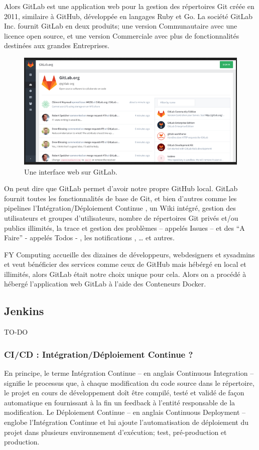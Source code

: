 \documentclass[a4paper,11pt,oneside]{report}
\begin{document}
Alors GitLab est une application web pour la gestion des répertoires Git créée en 2011, similaire à GitHub, développée en langages Ruby et Go. La société GitLab Inc. fournit GitLab en deux produits; une version Communautaire avec une licence open source, et une version Commerciale avec plus de fonctionnalités destinées aux grandes Entreprises.

\begin{figure}[H]
    \centering
    \includegraphics{exemple-gitlab.png}
    \caption{Une interface web sur GitLab.}
    \label{fig:exemple}
\end{figure}

On peut dire que GitLab permet d’avoir notre propre GitHub local. GitLab fournit toutes les fonctionnalités de base de Git, et bien d’autres comme les pipelines l’Intégration/Déploiement Continue , un Wiki intégré, gestion des utilisateurs et groupes d’utilisateurs, nombre de répertoires Git privés et/ou publics illimités, la trace et gestion des problèmes – appelés Issues – et des “A Faire” - appelés Todos - , les notifications , … et autres.
\newline

FY Computing accueille des dizaines de développeurs, webdesigners et sysadmins et veut bénéficier des services comme ceux de GitHub mais hébérgé en local et illimités, alors GitLab était notre choix unique pour cela. Alors on a procédé à hébergé l’application web GitLab à l’aide des Conteneurs Docker.

\subsection{Jenkins}

TO-DO

\subsubsection{CI/CD : Intégration/Déploiement Continue ?}
En principe, le terme Intégration Continue – en anglais Continuous Integration – signifie le processus que, à chaque modification du code source dans le répertoire, le projet en cours de développement doît être compilé, testé et validé de façon automatique en fournissant à la fin un feedback à l’entité responsable de la modification. Le Déploiement Continue – en anglais Continuous Deployment – englobe l’Intégration Continue et lui ajoute l’automatisation de déploiement du projet dans plusieurs environnement d’exécution; test, pré-production et production.
\newline
\end{document}
